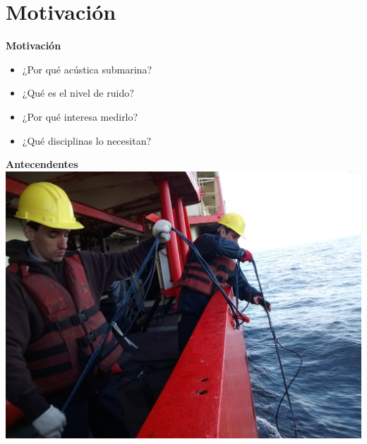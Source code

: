 \documentclass[11pt]{beamer}
\begin{document}
\section{Motivación}

\begin{frame}{\textbf{\LARGE{Motivación}}}
\fontsize{18pt}{18}\selectfont
	\vspace{-.7cm}
	\centering
	\begin{itemize}
	\item ¿Por qué acústica submarina?
	\vspace{15px}
	\item ¿Qué es el nivel de ruido?
	\vspace{15px}
	\item ¿Por qué interesa medirlo?
	\vspace{15px}	
	\item ¿Qué disciplinas lo necesitan?
	\end{itemize}
\end{frame}

\begin{frame}{\textbf{\LARGE{Antecendentes}}}
	\vspace{-.6cm}
		\includegraphics[width=.9\textwidth]{./imagenes/antecedentes.jpg}
\end{frame}
\end{document}
